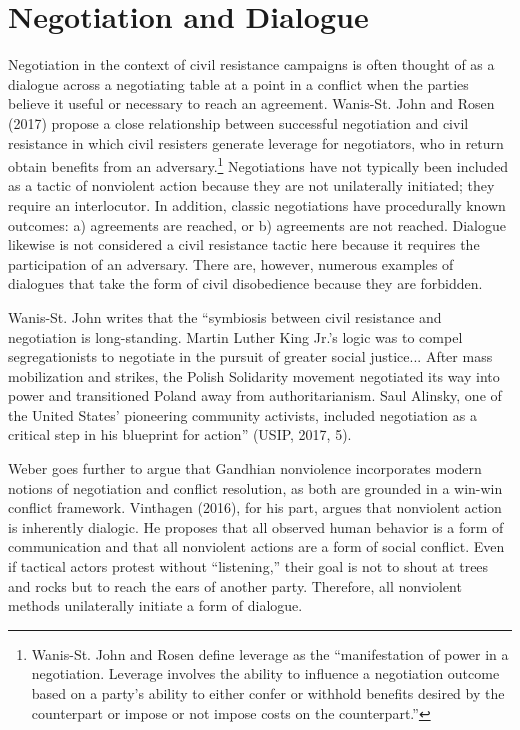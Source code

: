 \documentclass[twoside,a4paper,12pt,fleqn,openany]{extbook}
\begin{document}
\section*{Negotiation and Dialogue}

Negotiation in the context of civil resistance campaigns is often thought of as a dialogue across a negotiating table at a point in a conflict when the parties believe it useful or necessary to reach an agreement. Wanis-St. John and Rosen (2017) propose a close relationship between successful negotiation and civil resistance in which civil resisters generate leverage for negotiators, who in return obtain benefits from an adversary.\footnote{Wanis-St. John and Rosen define leverage as the “manifestation of power in a negotiation. Leverage involves the ability to influence a negotiation outcome based on a party’s ability to either confer or withhold benefits desired by the counterpart or impose or not impose costs on the counterpart.”} Negotiations have not typically been included as a tactic of nonviolent action because they are not unilaterally initiated; they require an interlocutor. In addition, classic negotiations have procedurally known outcomes: a) agreements are reached, or b) agreements are not reached. Dialogue likewise is not considered a civil resistance tactic here because it requires the participation of an adversary. There are, however, numerous examples of dialogues that take the form of civil disobedience because they are forbidden.

Wanis-St. John writes that the “symbiosis between civil resistance and negotiation is long-standing. Martin Luther King Jr.’s logic was to compel segregationists to negotiate in the pursuit of greater social justice... After mass mobilization and strikes, the Polish Solidarity movement negotiated its way into power and transitioned Poland away from authoritarianism. Saul Alinsky, one of the United States’ pioneering community activists, included negotiation as a critical step in his blueprint for action” (USIP, 2017, 5).

Weber goes further to argue that Gandhian nonviolence incorporates modern notions of negotiation and conflict resolution, as both are grounded in a win-win conflict framework. Vinthagen (2016), for his part, argues that nonviolent action is inherently dialogic. He proposes that all observed human behavior is a form of communication and that all nonviolent actions are a form of social conflict. Even if tactical actors protest without “listening,” their goal is not to shout at trees and rocks but to reach the ears of another party. Therefore, all nonviolent methods unilaterally initiate a form of dialogue.
\end{document}
